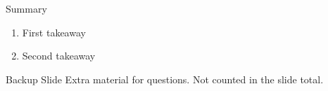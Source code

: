 \documentclass[10pt, aspectratio=169]{beamer}
\begin{document}
\begin{frame}{Summary}
  \begin{enumerate}
    \item First takeaway
    \item Second takeaway
  \end{enumerate}
\end{frame}


\appendix
\begin{frame}{Backup Slide}
  Extra material for questions. Not counted in the slide total.
\end{frame}
\end{document}
